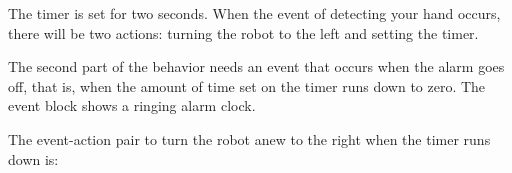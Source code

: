 The timer is set for two seconds. When the event of detecting your
hand occurs, there will be two actions: turning the robot to the left
and setting the timer.

The second part of the behavior needs an event that occurs when the alarm goes off,
that is, when the amount of time set on the timer runs down to zero. The
event block  shows a ringing alarm clock.

The event-action pair to turn the robot anew to
the right when the timer runs down is: 


